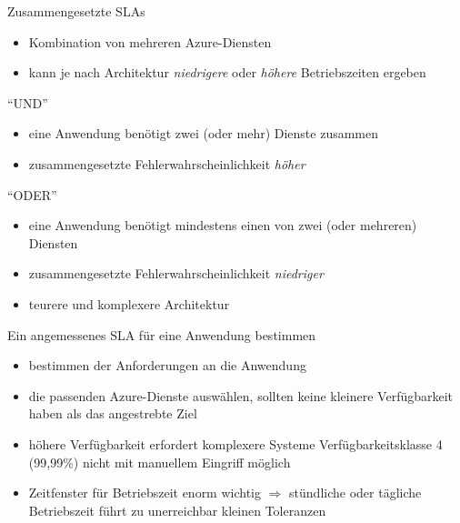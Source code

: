 \begin{flashcard}[\ ]{Zusammengesetzte SLAs}
    \begin{itemize}
        \item Kombination von mehreren Azure-Diensten
        \item kann je nach Architektur \emph{niedrigere} oder \emph{höhere} Betriebszeiten ergeben
    \end{itemize}
    ``UND''
    \begin{itemize}
        \item eine Anwendung benötigt zwei (oder mehr) Dienste zusammen
        \item zusammengesetzte Fehlerwahrscheinlichkeit \emph{höher}
    \end{itemize}
    ``ODER''
    \begin{itemize}
        \item eine Anwendung benötigt mindestens einen von zwei (oder mehreren) Diensten
        \item zusammengesetzte Fehlerwahrscheinlichkeit \emph{niedriger}
        \item teurere und komplexere Architektur
    \end{itemize}
\end{flashcard}

\begin{flashcard}[Beschreibe]{Ein angemessenes SLA für eine Anwendung bestimmen}
        \begin{itemize}
            \item bestimmen der Anforderungen an die Anwendung
            \item die passenden Azure-Dienste auswählen, sollten keine kleinere Verfügbarkeit haben als das angestrebte Ziel
            \item höhere Verfügbarkeit erfordert komplexere Systeme\newline
            Verfügbarkeitsklasse 4 (99,99\%) nicht mit manuellem Eingriff möglich
            \item Zeitfenster für Betriebszeit enorm wichtig\newline
            $\Rightarrow$ stündliche oder tägliche Betriebszeit führt zu unerreichbar kleinen Toleranzen
        \end{itemize}
\end{flashcard}
